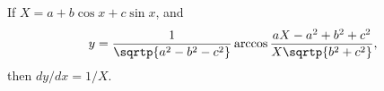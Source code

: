 If $X = a + b\cos x + c\sin x$, and
\[
y = \frac{1}{\sqrtp{a^{2} - b^{2} -c^{2}}}
  \arccos \frac{aX - a^{2} + b^{2} + c^{2}}{X \sqrtp{b^{2} + c^{2}}},
\]
then $dy/dx = 1/X$.

